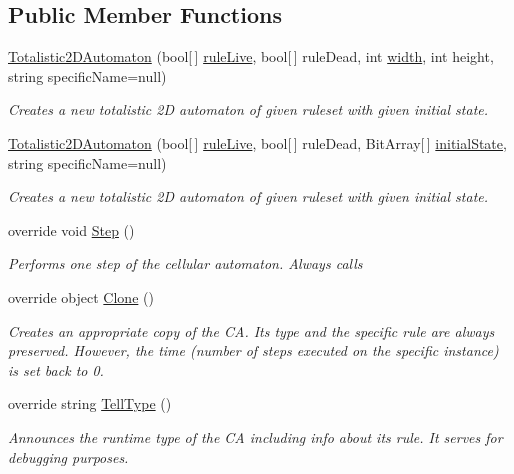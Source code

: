 \subsection*{Public Member Functions}
\begin{DoxyCompactItemize}
\item 
\hyperlink{class_cellular_1_1_totalistic2_d_automaton_a4c7a751baa03c7caf2040d07bb772e91}{Totalistic2\+D\+Automaton} (bool\mbox{[}$\,$\mbox{]} \hyperlink{class_cellular_1_1_totalistic2_d_automaton_a4752e3402c58243f7f342e21ddad3b05}{rule\+Live}, bool\mbox{[}$\,$\mbox{]} rule\+Dead, int \hyperlink{class_cellular_1_1_automaton2_d_a1e9e5ec637c747a859c346839c90d174}{width}, int height, string specific\+Name=null)
\begin{DoxyCompactList}\small\item\em Creates a new totalistic 2\+D automaton of given ruleset with given initial state. \end{DoxyCompactList}\item 
\hyperlink{class_cellular_1_1_totalistic2_d_automaton_a706f4c765a54fef6003e6e208a073a1c}{Totalistic2\+D\+Automaton} (bool\mbox{[}$\,$\mbox{]} \hyperlink{class_cellular_1_1_totalistic2_d_automaton_a4752e3402c58243f7f342e21ddad3b05}{rule\+Live}, bool\mbox{[}$\,$\mbox{]} rule\+Dead, Bit\+Array\mbox{[}$\,$\mbox{]} \hyperlink{all__1_8js_ae8b87ff4be2ae1dd5267342795263360}{initial\+State}, string specific\+Name=null)
\begin{DoxyCompactList}\small\item\em Creates a new totalistic 2\+D automaton of given ruleset with given initial state. \end{DoxyCompactList}\item 
override void \hyperlink{class_cellular_1_1_totalistic2_d_automaton_a7f85cac5420f67a936cbd4cef33c4abc}{Step} ()
\begin{DoxyCompactList}\small\item\em Performs one step of the cellular automaton. Always calls \end{DoxyCompactList}\item 
override object \hyperlink{class_cellular_1_1_totalistic2_d_automaton_ae78cf4c3f8245adf64ec9a173330804f}{Clone} ()
\begin{DoxyCompactList}\small\item\em Creates an appropriate copy of the C\+A. Its type and the specific rule are always preserved. However, the time (number of steps executed on the specific instance) is set back to 0. \end{DoxyCompactList}\item 
override string \hyperlink{class_cellular_1_1_totalistic2_d_automaton_aa009c674cd109fa70173e9893f6d3b09}{Tell\+Type} ()
\begin{DoxyCompactList}\small\item\em Announces the runtime type of the C\+A including info about its rule. It serves for debugging purposes. \end{DoxyCompactList}\end{DoxyCompactItemize}

